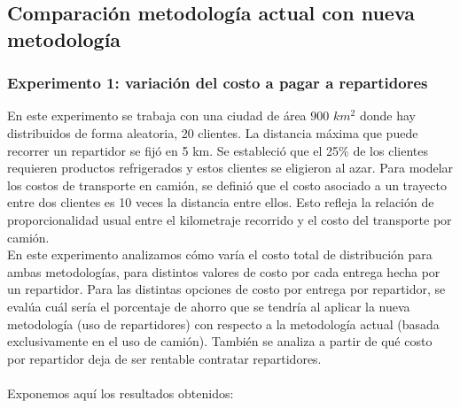 \documentclass{article}
\begin{document}
    \subsection{Comparación metodología actual con nueva metodología}

    \subsubsection{Experimento 1: variación del costo a pagar a repartidores}

    En este experimento se trabaja con una ciudad de área $900$  $km^{2}$ donde hay distribuidos de forma aleatoria, 20 clientes. La distancia máxima que puede recorrer un repartidor se fijó en 5 km.
    Se estableció que el 25\% de los clientes requieren productos refrigerados y estos clientes se eligieron al azar.
    Para modelar los costos de transporte en camión, se definió que el costo asociado a un trayecto entre dos clientes es 10 veces la distancia entre ellos. Esto refleja la relación de proporcionalidad usual entre el kilometraje recorrido y el costo del transporte por camión. \\
    En este experimento analizamos cómo varía el costo total de distribución para ambas metodologías, para distintos valores de costo por cada entrega hecha por un repartidor. Para las distintas opciones de costo por entrega por repartidor, se evalúa cuál sería el porcentaje de ahorro que se tendría al aplicar la nueva metodología (uso de repartidores) con respecto a la metodología actual (basada exclusivamente en el uso de camión). También se analiza a partir de qué costo por repartidor deja de ser rentable contratar repartidores. \\
    \\
    Exponemos aquí los resultados obtenidos:
\end{document}
